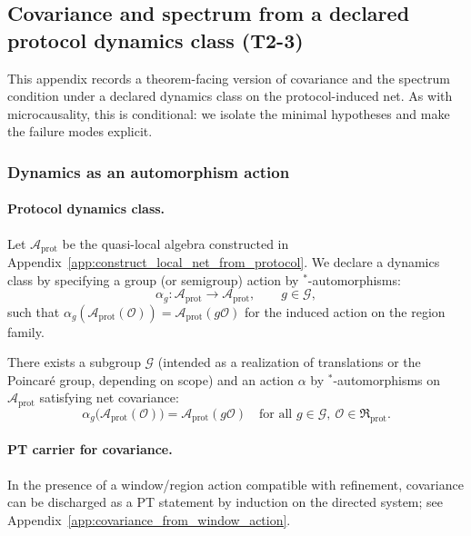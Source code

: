 \subsection{Covariance and spectrum from a declared protocol dynamics class (T2-3)}
\label{app:covariance_spectrum_from_protocol_dynamics}

\AuditTag This appendix records a theorem-facing version of covariance and the spectrum condition under a declared dynamics class on the protocol-induced net.
As with microcausality, this is conditional: we isolate the minimal hypotheses and make the failure modes explicit.

\subsubsection{Dynamics as an automorphism action}
\paragraph{Protocol dynamics class.}
Let $\mathcal{A}_{\mathrm{prot}}$ be the quasi-local algebra constructed in Appendix~\ref{app:construct_local_net_from_protocol}.
We declare a dynamics class by specifying a group (or semigroup) action by $^\ast$-automorphisms:
\[
\alpha_g:\mathcal{A}_{\mathrm{prot}}\to\mathcal{A}_{\mathrm{prot}},
\qquad g\in \mathcal{G},
\]
such that $\alpha_g(\mathcal{A}_{\mathrm{prot}}(\mathcal{O}))=\mathcal{A}_{\mathrm{prot}}(g\mathcal{O})$ for the induced action on the region family.

\begin{assumption}
\label{ass:covariant_dynamics_class}
There exists a subgroup $\mathcal{G}$ (intended as a realization of translations or the Poincar\'e group, depending on scope) and an action $\alpha$ by $^\ast$-automorphisms on $\mathcal{A}_{\mathrm{prot}}$ satisfying net covariance:
\[
\alpha_g\bigl(\mathcal{A}_{\mathrm{prot}}(\mathcal{O})\bigr)=\mathcal{A}_{\mathrm{prot}}(g\mathcal{O})
\quad\text{for all }g\in\mathcal{G},\ \mathcal{O}\in\mathfrak{R}_{\mathrm{prot}}.
\]
\end{assumption}

\paragraph{PT carrier for covariance.}
\AuditTag In the presence of a window/region action compatible with refinement, covariance can be discharged as a PT statement by induction on the directed system; see Appendix~\ref{app:covariance_from_window_action}.

